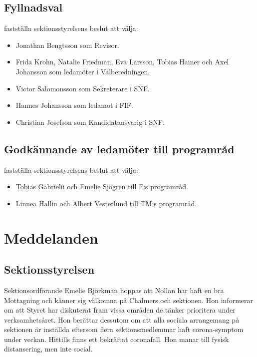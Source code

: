 \documentclass[hidelinks]{sektionsmote}
\begin{document}
\subsection{Fyllnadsval}
\begin{beslut}
    \item fastställa sektionsstyrelsens beslut att välja:
    \begin{itemize}
        \item Jonathan Bengtsson som Revisor.
        \item Frida Krohn, Natalie Friedman, Eva Larsson, Tobias Hainer och Axel Johansson som ledamöter i Valberedningen.
        \item Victor Salomonsson som Sekreterare i SNF.
        \item Hannes Johansson som ledamot i FIF.
        \item Christian Josefson som Kandidatansvarig i SNF.
    \end{itemize}
\end{beslut}

\subsection{Godkännande av ledamöter till programråd}
\begin{beslut}
    \item fastställa sektionsstyrelsens beslut att välja:
    \begin{itemize}
        \item Tobias Gabrielii och Emelie Sjögren till F:s programråd.
        \item Linnea Hallin och Albert Vesterlund till TM:s programråd.
    \end{itemize}
\end{beslut}


\section{Meddelanden}

\subsection{Sektionsstyrelsen}
Sektionsordförande Emelie Björkman hoppas att Nollan har haft en bra Mottagning och känner sig välkomna på Chalmers och sektionen.
Hon informerar om att Styret har diskuterat fram vissa områden de tänker prioritera under verksamhetsåret.
Hon berättar dessutom om att alla sociala arrangemang på sektionen är inställda eftersom flera sektionsmedlemmar haft corona-symptom under veckan.
Hittills finns ett bekräftat coronafall.
Hon manar till fysisk distansering, men inte social.
\end{document}
